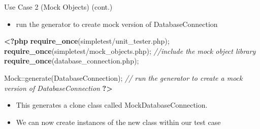 \documentclass[
  ignorenonframetext,
]{beamer}
\newenvironment{Shaded}{\begin{snugshade}}{\end{snugshade}}
\newcommand{\CommentTok}[1]{\textcolor[rgb]{0.56,0.35,0.01}{\textit{#1}}}
\newcommand{\ConstantTok}[1]{\textcolor[rgb]{0.00,0.00,0.00}{#1}}
\newcommand{\KeywordTok}[1]{\textcolor[rgb]{0.13,0.29,0.53}{\textbf{#1}}}
\newcommand{\NormalTok}[1]{#1}
\newcommand{\OperatorTok}[1]{\textcolor[rgb]{0.81,0.36,0.00}{\textbf{#1}}}
\newcommand{\OtherTok}[1]{\textcolor[rgb]{0.56,0.35,0.01}{#1}}
\newcommand{\StringTok}[1]{\textcolor[rgb]{0.31,0.60,0.02}{#1}}
\newcommand{\VariableTok}[1]{\textcolor[rgb]{0.00,0.00,0.00}{#1}}
\providecommand{\tightlist}{%
  \setlength{\itemsep}{0pt}\setlength{\parskip}{0pt}}
\begin{document}
\begin{frame}[fragile]{Use Case 2 (Mock Objects) (cont.)}
\protect\hypertarget{use-case-2-mock-objects-cont.}{}
\begin{itemize}
\tightlist
\item
  run the generator to create mock version of DatabaseConnection
\end{itemize}

\begin{Shaded}
\begin{Highlighting}[]
\KeywordTok{\textless{}?php}
\KeywordTok{require\_once}\NormalTok{(}\StringTok{\textquotesingle{}simpletest/unit\_tester.php\textquotesingle{}}\NormalTok{)}\OtherTok{;}
\KeywordTok{require\_once}\NormalTok{(}\StringTok{\textquotesingle{}simpletest/mock\_objects.php\textquotesingle{}}\NormalTok{)}\OtherTok{;}    \CommentTok{//include the mock object library}
\KeywordTok{require\_once}\NormalTok{(}\StringTok{\textquotesingle{}database\_connection.php\textquotesingle{}}\NormalTok{)}\OtherTok{;}

\ConstantTok{M}\NormalTok{ock::generate(}\StringTok{\textquotesingle{}DatabaseConnection\textquotesingle{}}\NormalTok{)}\OtherTok{;}           \CommentTok{// run the generator to create a mock version of DatabaseConnection}
\KeywordTok{?\textgreater{}}
\end{Highlighting}
\end{Shaded}

\begin{itemize}
\tightlist
\item
  This generates a clone class called MockDatabaseConnection.
\item
  We can now create instances of the new class within our test case
\end{itemize}

\begin{Shaded}
\end{Shaded}
\end{frame}
\end{document}
